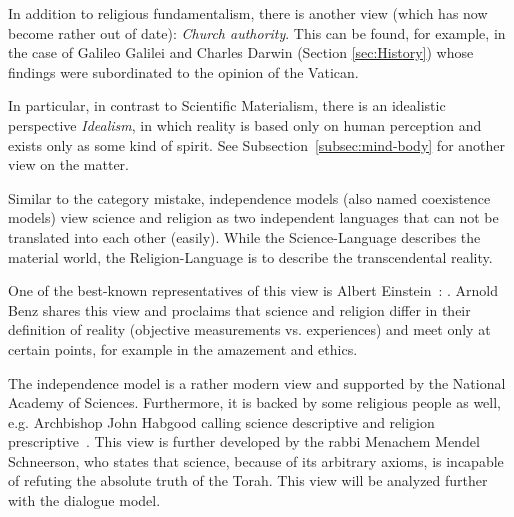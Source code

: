 In addition to religious fundamentalism, there is another view (which has now become rather out of date): \emph{Church authority}.
This can be found, for example, in the case of Galileo Galilei and Charles Darwin (Section \ref{sec:History}) whose findings were subordinated to the opinion of the Vatican.


In particular, in contrast to Scientific Materialism, there is an idealistic perspective \emph{Idealism}, in which reality is based only on human perception and exists only as some kind of spirit.
See Subsection~\ref{subsec:mind-body} for another view on the matter.




\label{subsec:independence}

Similar to the category mistake, independence models (also named coexistence models) view science and religion as two independent languages that can not be translated into each other (easily).
While the Science-Language describes the  material world, the Religion-Language is to describe the transcendental reality.

One of the best-known representatives of this view is Albert Einstein~\cite[p.~605\,ff.]{einstein1940science}:
.
Arnold Benz shares this view and proclaims that science and religion
differ in their definition of reality (objective measurements vs. experiences) and meet only at certain points, for example in the amazement and ethics.

The independence model is a rather modern view and supported by the
National Academy of Sciences.
Furthermore, it is backed by some religious people as well, e.g. Archbishop John Habgood calling science descriptive and religion prescriptive~\cite{habgood1964religion}.
This view is further developed by the rabbi Menachem Mendel Schneerson, who states that science, because of its arbitrary axioms, is incapable of refuting the absolute truth of the Torah. This view will be analyzed further with the dialogue model.

